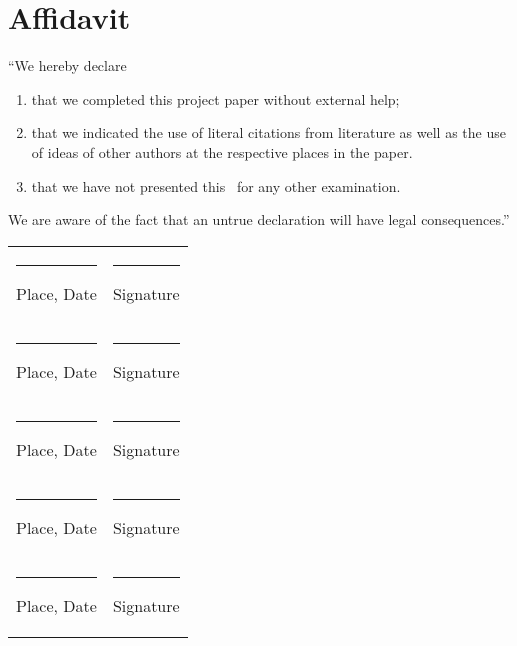 \newpage
\pagestyle{empty}

\section*{Affidavit}

\vspace{0.5cm}

``We hereby declare\\

\begin{enumerate}
	\item that we completed this project paper without external help;
	\item that we indicated the use of literal citations from literature as well as the use of ideas of other authors at the respective places in the paper.
	\item that we have not presented this \papertype \ for any other examination.
\end{enumerate}

We are aware of the fact that an untrue declaration will have legal consequences.''
\\
\vspace{2.6cm}

\renewcommand{\arraystretch}{2} %

\begin{tabular*}{\textwidth} {p{} p{}}

\rule{0.3\textwidth}{1pt} \newline Place, Date & \rule{0.4\textwidth}{1pt}\newline Signature\\

\rule{0.3\textwidth}{1pt} \newline Place, Date & \rule{0.4\textwidth}{1pt}\newline Signature\\

\rule{0.3\textwidth}{1pt} \newline Place, Date & \rule{0.4\textwidth}{1pt}\newline Signature\\

\rule{0.3\textwidth}{1pt} \newline Place, Date & \rule{0.4\textwidth}{1pt}\newline Signature\\

\rule{0.3\textwidth}{1pt} \newline Place, Date & \rule{0.4\textwidth}{1pt}\newline Signature\\
\end{tabular*}
